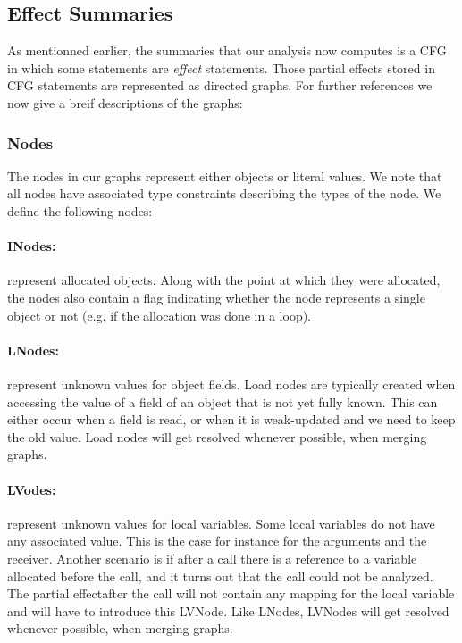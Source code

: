 \documentclass[a4paper]{article}
\begin{document}
\subsection{Effect Summaries}
As mentionned earlier, the summaries that our analysis now computes is a CFG in
which some statements are \emph{effect} statements. Those partial effects
stored in CFG statements are represented as directed graphs. For further
references we now give a breif descriptions of the graphs:

\subsubsection{Nodes}
The nodes in our graphs represent either objects or literal values. We note
that all nodes have associated type constraints describing the types of the
node. We define the following nodes:

\paragraph{INodes:} represent allocated objects. Along with the point at which
they were allocated, the nodes also contain a flag indicating whether the node
represents a single object or not (e.g. if the allocation was done in a loop).

\paragraph{LNodes:} represent unknown values for object fields. Load nodes are
typically created when accessing the value of a field of an object that is not
yet fully known. This can either occur when a field is read, or when it is
weak-updated and we need to keep the old value. Load nodes will get resolved
whenever possible, when merging graphs.

\paragraph{LVodes:} represent unknown values for local variables. Some local
variables do not have any associated value. This is the case for instance for
the arguments and the receiver. Another scenario is if after a call there is a
reference to a variable allocated before the call, and it turns out that the
call could not be analyzed. The partial effectafter the call will not contain
any mapping for the local variable and will have to introduce this LVNode.
Like LNodes, LVNodes will get resolved whenever possible, when merging graphs.
\end{document}
